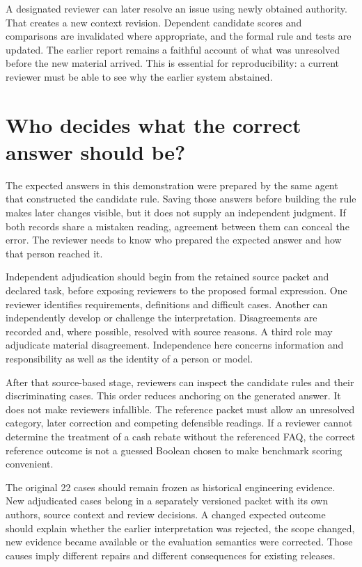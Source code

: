 A designated reviewer can later resolve an issue using newly obtained authority.
That creates a new context revision. Dependent candidate scores and comparisons
are invalidated where appropriate, and the formal rule and tests are updated.
The earlier report remains a faithful account of what was unresolved before the
new material arrived. This is essential for reproducibility: a current reviewer
must be able to see why the earlier system abstained.

\section{Who decides what the correct answer should be?}
\label{merge:M02:08}

\label{sec:circular-independent}
The expected answers in this demonstration were prepared by the same agent that
constructed the candidate rule. Saving those answers before building the rule
makes later changes visible, but it does not supply an independent judgment.
If both records share a mistaken reading, agreement between them can conceal
the error. The reviewer needs to know who prepared the expected answer and how
that person reached it.

Independent adjudication should begin from the retained source packet and
declared task, before exposing reviewers to the proposed formal expression.
One reviewer identifies requirements, definitions and difficult cases. Another
can independently develop or challenge the interpretation. Disagreements are
recorded and, where possible, resolved with source reasons. A third role may
adjudicate material disagreement. Independence here concerns information and
responsibility as well as the identity of a person or model.


After that source-based stage, reviewers can inspect the candidate rules and
their discriminating cases. This order reduces anchoring on the generated
answer. It does not make reviewers infallible. The reference packet must allow
an unresolved category, later correction and competing defensible readings.
If a reviewer cannot determine the treatment of a cash rebate without the
referenced FAQ, the correct reference outcome is not a guessed Boolean chosen
to make benchmark scoring convenient.

The original 22 cases should remain frozen as historical engineering evidence.
New adjudicated cases belong in a separately versioned packet with its own
authors, source context and review decisions. A changed expected outcome should
explain whether the earlier interpretation was rejected, the scope changed,
new evidence became available or the evaluation semantics were corrected.
Those causes imply different repairs and different consequences for existing
releases.

